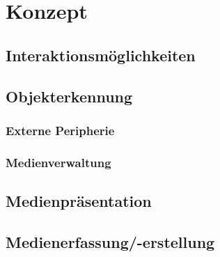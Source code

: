 \chapter{Konzept}
%
%
\section{Interaktionsmöglichkeiten}
%
%
\section{Objekterkennung}
%
%
\subsection{Externe Peripherie}
%
%
\subsection{Medienverwaltung}
%
%
\section{Medienpräsentation}
%
%
\section{Medienerfassung/-erstellung}
